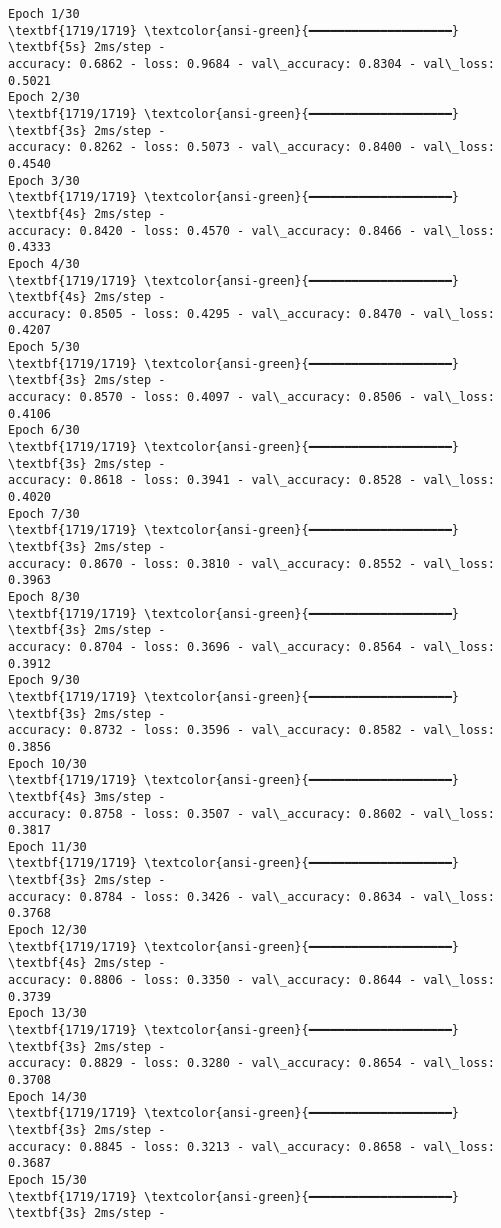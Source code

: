 \documentclass[12pt letter]{report}
\begin{document}
    \begin{Verbatim}[commandchars=\\\{\}]
Epoch 1/30
\textbf{1719/1719} \textcolor{ansi-green}{━━━━━━━━━━━━━━━━━━━━} \textbf{5s} 2ms/step -
accuracy: 0.6862 - loss: 0.9684 - val\_accuracy: 0.8304 - val\_loss: 0.5021
Epoch 2/30
\textbf{1719/1719} \textcolor{ansi-green}{━━━━━━━━━━━━━━━━━━━━} \textbf{3s} 2ms/step -
accuracy: 0.8262 - loss: 0.5073 - val\_accuracy: 0.8400 - val\_loss: 0.4540
Epoch 3/30
\textbf{1719/1719} \textcolor{ansi-green}{━━━━━━━━━━━━━━━━━━━━} \textbf{4s} 2ms/step -
accuracy: 0.8420 - loss: 0.4570 - val\_accuracy: 0.8466 - val\_loss: 0.4333
Epoch 4/30
\textbf{1719/1719} \textcolor{ansi-green}{━━━━━━━━━━━━━━━━━━━━} \textbf{4s} 2ms/step -
accuracy: 0.8505 - loss: 0.4295 - val\_accuracy: 0.8470 - val\_loss: 0.4207
Epoch 5/30
\textbf{1719/1719} \textcolor{ansi-green}{━━━━━━━━━━━━━━━━━━━━} \textbf{3s} 2ms/step -
accuracy: 0.8570 - loss: 0.4097 - val\_accuracy: 0.8506 - val\_loss: 0.4106
Epoch 6/30
\textbf{1719/1719} \textcolor{ansi-green}{━━━━━━━━━━━━━━━━━━━━} \textbf{3s} 2ms/step -
accuracy: 0.8618 - loss: 0.3941 - val\_accuracy: 0.8528 - val\_loss: 0.4020
Epoch 7/30
\textbf{1719/1719} \textcolor{ansi-green}{━━━━━━━━━━━━━━━━━━━━} \textbf{3s} 2ms/step -
accuracy: 0.8670 - loss: 0.3810 - val\_accuracy: 0.8552 - val\_loss: 0.3963
Epoch 8/30
\textbf{1719/1719} \textcolor{ansi-green}{━━━━━━━━━━━━━━━━━━━━} \textbf{3s} 2ms/step -
accuracy: 0.8704 - loss: 0.3696 - val\_accuracy: 0.8564 - val\_loss: 0.3912
Epoch 9/30
\textbf{1719/1719} \textcolor{ansi-green}{━━━━━━━━━━━━━━━━━━━━} \textbf{3s} 2ms/step -
accuracy: 0.8732 - loss: 0.3596 - val\_accuracy: 0.8582 - val\_loss: 0.3856
Epoch 10/30
\textbf{1719/1719} \textcolor{ansi-green}{━━━━━━━━━━━━━━━━━━━━} \textbf{4s} 3ms/step -
accuracy: 0.8758 - loss: 0.3507 - val\_accuracy: 0.8602 - val\_loss: 0.3817
Epoch 11/30
\textbf{1719/1719} \textcolor{ansi-green}{━━━━━━━━━━━━━━━━━━━━} \textbf{3s} 2ms/step -
accuracy: 0.8784 - loss: 0.3426 - val\_accuracy: 0.8634 - val\_loss: 0.3768
Epoch 12/30
\textbf{1719/1719} \textcolor{ansi-green}{━━━━━━━━━━━━━━━━━━━━} \textbf{4s} 2ms/step -
accuracy: 0.8806 - loss: 0.3350 - val\_accuracy: 0.8644 - val\_loss: 0.3739
Epoch 13/30
\textbf{1719/1719} \textcolor{ansi-green}{━━━━━━━━━━━━━━━━━━━━} \textbf{3s} 2ms/step -
accuracy: 0.8829 - loss: 0.3280 - val\_accuracy: 0.8654 - val\_loss: 0.3708
Epoch 14/30
\textbf{1719/1719} \textcolor{ansi-green}{━━━━━━━━━━━━━━━━━━━━} \textbf{3s} 2ms/step -
accuracy: 0.8845 - loss: 0.3213 - val\_accuracy: 0.8658 - val\_loss: 0.3687
Epoch 15/30
\textbf{1719/1719} \textcolor{ansi-green}{━━━━━━━━━━━━━━━━━━━━} \textbf{3s} 2ms/step -

\end{Verbatim}
\end{document}

